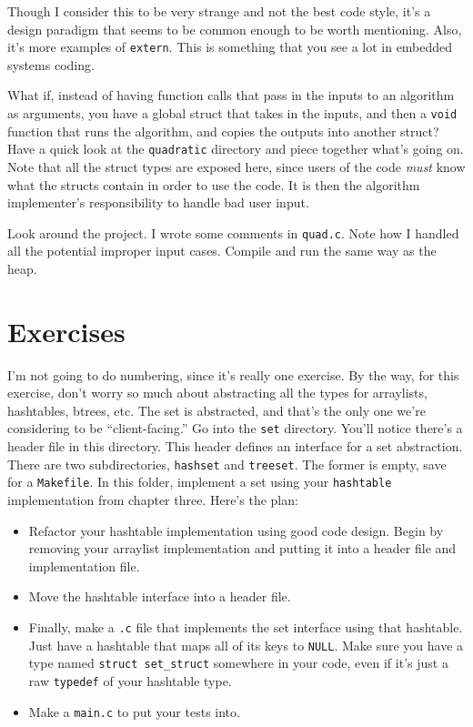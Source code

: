 \documentclass[ebook,11pt,oneside,openany]{memoir}
\newcommand{\cf}[1]{\texttt{#1}}
\begin{document}
Though I consider this to be very strange and not the best code style, it's a design paradigm that seems to be common enough to be worth mentioning. Also, it's more examples of \cf{extern}. This is something that you see a lot in embedded systems coding.

What if, instead of having function calls that pass in the inputs to an algorithm as arguments, you have a global struct that takes in the inputs, and then a \cf{void} function that runs the algorithm, and copies the outputs into another struct? Have a quick look at the \cf{quadratic} directory and piece together what's going on. Note that all the struct types are exposed here, since users of the code \textit{must} know what the structs contain in order to use the code. It is then the algorithm implementer's responsibility to handle bad user input.

Look around the project. I wrote some comments in \cf{quad.c}. Note how I handled all the potential improper input cases. Compile and run the same way as the heap.

\section{Exercises}

I'm not going to do numbering, since it's really one exercise. By the way, for this exercise, don't worry so much about abstracting all the types for arraylists, hashtables, btrees, etc. The set is abstracted, and that's the only one we're considering to be ``client-facing.'' Go into the \cf{set} directory. You'll notice there's a header file in this directory. This header defines an interface for a set abstraction. There are two subdirectories, \cf{hashset} and \cf{treeset}. The former is empty, save for a \cf{Makefile}. In this folder, implement a set using your \cf{hashtable} implementation from chapter three. Here's the plan:

\begin{itemize}
\item Refactor your hashtable implementation using good code design. Begin by removing your arraylist implementation and putting it into a header file and implementation file. 

\item Move the hashtable interface into a header file. 

\item Finally, make a \cf{.c} file that implements the set interface using that hashtable. Just have a hashtable that maps all of its keys to \cf{NULL}. Make sure you have a type named \cf{struct set\_struct} somewhere in your code, even if it's just a raw \cf{typedef} of your hashtable type.

\item Make a \cf{main.c} to put your tests into.
\end{itemize}
\end{document}
